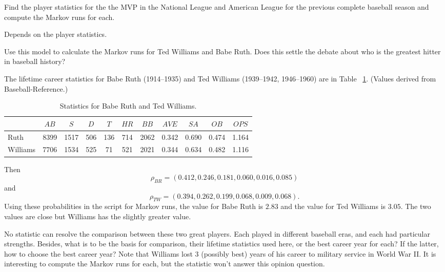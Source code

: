 \documentclass[12pt]{article}
\begin{document}
\begin{exercise}
    Find the player statistics for the the MVP in the National League
    and American League for the previous complete baseball season and
    compute the Markov runs for each.
\end{exercise}
\begin{solution}
    Depends on the player statistics.
\end{solution}

\begin{exercise}
    Use this model to calculate the Markov runs for Ted Williams and
    Babe Ruth.  Does this settle the debate about who is the greatest
    hitter in baseball history?
\end{exercise}
\begin{solution}
    The lifetime career statistics for Babe Ruth (1914--1935) and Ted
    Williams (1939--1942, 1946--1960) are in Table~%
    \ref{tab:baseball:ruthwilliams}.  (Values derived from 
    {Baseball-Reference}.)
    \begin{table}
        \centering
        \begin{tabular}{lcccccccccc}
            \toprule          & \(\mathit{AB}\) & \(S\) & \(D\) & \(T\) & \(\mathit{HR}\) & \(\mathit{BB}\) & \(\mathit{AVE}\) & \(SA\)  & \(OB\) & \(OPS\) \\ 
            \midrule Ruth     & 8399            & 1517  & 506   & 136   & 714             & 2062            & 0.342            & 0.690   & 0.474  & 1.164   \\ 
            Williams          & 7706            & 1534  & 525   & 71    & 521             & 2021            & 0.344            & 0.634   & 0.482  & 1.116   \\ 
            \bottomrule
        \end{tabular}
        \caption{Statistics for Babe Ruth and Ted Williams.}%
        \label{tab:baseball:ruthwilliams}
    \end{table}
    Then
    \[
        \rho_{BR} = (0.412, 0.246, 0.181, 0.060, 0.016, 0.085)
    \] and
    \[
        \rho_{TW} = (0.394, 0.262, 0.199, 0.068, 0.009, 0.068).
    \] Using these probabilities in the script for Markov runs, the
    value for Babe Ruth is \( 2.83 \) and the value for Ted Williams is \(
    3.05 \). The two values are close but Williams has the slightly
    greater value.

    No statistic can resolve the comparison between these two great
    players.  Each played in different baseball eras, and each had
    particular strengths.  Besides, what is to be the basis for
    comparison, their lifetime statistics used here, or the best career
    year for each?  If the latter, how to choose the best career year?
    Note that Williams lost 3 (possibly best) years of his career to
    military service in World War II\@.  It is interesting to compute
    the Markov runs for each, but the statistic won't answer this
    opinion question.

\end{solution}
\end{document}
